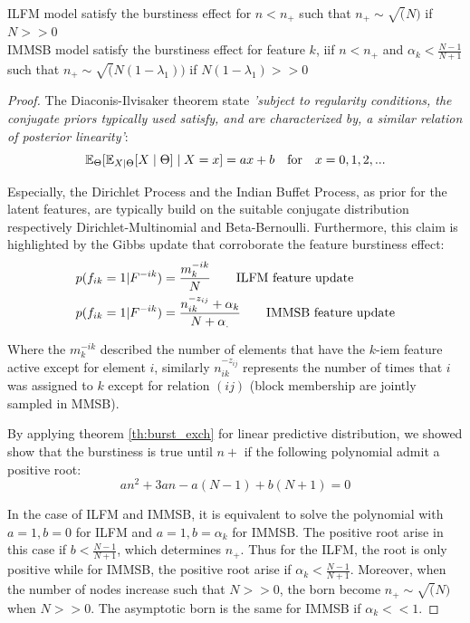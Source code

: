 \begin{proposition} \label{prop:diaconis}
    ILFM model satisfy the burstiness effect for $n<n_+$ such that $n_+ \sim \sqrt(N)$  if $N>>0$ \\
    IMMSB model satisfy the burstiness effect for feature $k$, iif $n<n_+$ and $\alpha_k<\frac{N-1}{N+1}$ such that $n_+ \sim \sqrt(N(1-\lambda_1))$ if $N(1-\lambda_1)>>0$ 
\end{proposition}

\begin{proof}
The Diaconis-Ilvisaker theorem \cite{diaconis1979conjugate} state \emph{'subject to regularity conditions, the conjugate priors typically used satisfy, and are characterized by, a  similar relation of posterior linearity'}:
\begin{equation}
\mathbb{E}_\Theta[\mathbb{E}_{X|\Theta}[X\mid \Theta] \mid X=x] = ax+b \quad \textnormal{for} \quad x=0,1,2,... \nonumber
\end{equation}

Especially, the Dirichlet Process and the Indian Buffet Process, as prior for the latent features, are typically build on the suitable conjugate distribution respectively Dirichlet-Multinomial and Beta-Bernoulli. Furthermore, this claim is highlighted by the Gibbs update that corroborate the feature burstiness effect:
\begin{align} \label{eq:feat_up}
&\p(f_{ik} = 1 | F^{-ik}) = \frac{m_k^{-ik}}{N} \qquad \text{ILFM feature update} \nonumber \\
&\p(f_{ik} = 1 | F^{-ik}) = \frac{n_{ik}^{-z_{ij}}+\alpha_k}{N+\alpha_.} \qquad \text{IMMSB feature update} \nonumber \\
\end{align}

Where the $m_k^{-ik}$ described the number of elements that have the $k$-iem feature active except for element $i$, similarly $n_{ik}^{-z_{ij}}$ represents the number of times that $i$ was assigned to $k$ except for relation $(ij)$ (block membership are jointly sampled in MMSB).

By applying theorem \ref{th:burst_exch} for linear predictive distribution, we showed show that the burstiness is true until $n+$ if the following polynomial admit a positive root:
\begin{equation}
	 an^2 + 3an - a(N-1) + b(N+1) = 0
\end{equation}

    In the case of ILFM and IMMSB, it is equivalent to solve the polynomial with $a=1, b=0$ for ILFM and $a=1, b=\alpha_k$ for IMMSB. The positive root arise in this case if $b < \frac{N-1}{N+1}$, which determines $n_+$. Thus for the ILFM, the root is only positive while for IMMSB, the positive root arise if $\alpha_k < \frac{N-1}{N+1}$. Moreover, when the number of nodes increase such that $N >> 0$, the born become $n_+ \sim \sqrt(N)$ when $N >> 0$. The asymptotic born is the same for IMMSB if $\alpha_k << 1$.
\end{proof}

